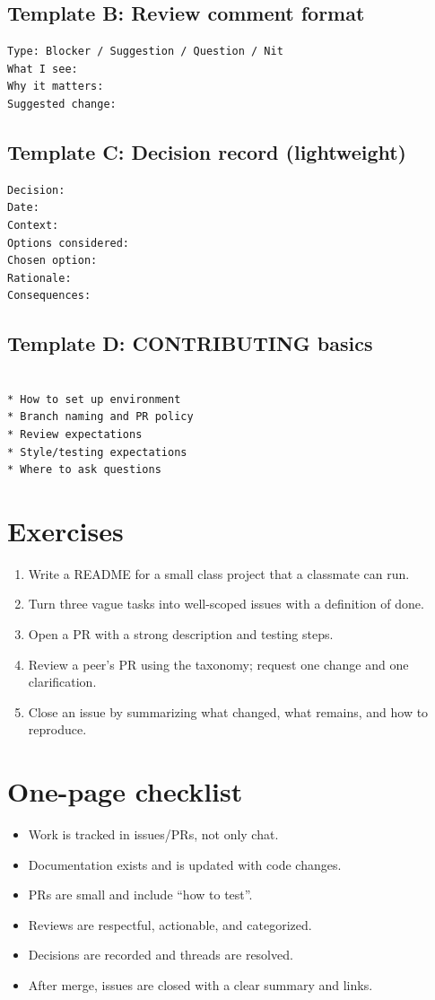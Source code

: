 \subsection{Template B: Review comment format}
\begin{verbatim}
Type: Blocker / Suggestion / Question / Nit
What I see:
Why it matters:
Suggested change:
\end{verbatim}

\subsection{Template C: Decision record (lightweight)}
\begin{verbatim}
Decision:
Date:
Context:
Options considered:
Chosen option:
Rationale:
Consequences:
\end{verbatim}

\subsection{Template D: CONTRIBUTING basics}
\begin{verbatim}

* How to set up environment
* Branch naming and PR policy
* Review expectations
* Style/testing expectations
* Where to ask questions
  \end{verbatim}

\section{Exercises}
\begin{enumerate}
\item Write a README for a small class project that a classmate can run.
\item Turn three vague tasks into well-scoped issues with a definition of done.
\item Open a PR with a strong description and testing steps.
\item Review a peer's PR using the taxonomy; request one change and one clarification.
\item Close an issue by summarizing what changed, what remains, and how to reproduce.
\end{enumerate}

\section{One-page checklist}
\begin{itemize}
\item Work is tracked in issues/PRs, not only chat.
\item Documentation exists and is updated with code changes.
\item PRs are small and include ``how to test''.
\item Reviews are respectful, actionable, and categorized.
\item Decisions are recorded and threads are resolved.
\item After merge, issues are closed with a clear summary and links.
\end{itemize}

